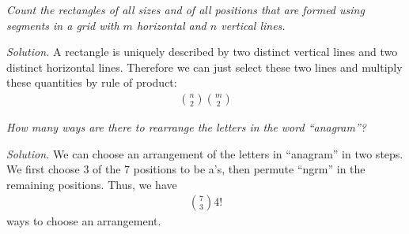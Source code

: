\documentclass[11pt,largemargins]{homework}
\begin{document}
\begin{alphaparts}
  \questionpart
    \textit{Count the rectangles of all sizes and of all positions that are formed
    using segments in a grid with \(m\) horizontal and \(n\) vertical lines.}

    \textit{Solution.} A rectangle is uniquely described by two distinct vertical
    lines and two distinct horizontal lines. Therefore we can just select these two
    lines and multiply these quantities by rule of product:
    \begin{align*}
      \binom{n}{2}\binom{m}{2}
    \end{align*}

  \questionpart
    \textit{How many ways are there to rearrange the letters in the word
    ``anagram''?}

    \textit{Solution.} We can choose an arrangement of the letters in
    ``anagram'' in two steps. We first choose 3 of the 7 positions to be a's,
    then permute ``ngrm'' in the remaining positions. Thus, we have
    \begin{align*}
      \binom{7}{3} 4!
    \end{align*}
    ways to choose an arrangement.
\end{alphaparts}
\end{document}
